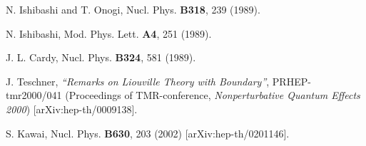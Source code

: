 \documentclass[a4paper,12pt]{article}
\begin{document}
\begin{thebibliography}{99}
  N. Ishibashi and T. Onogi,
Nucl. Phys. \textbf{B318}, 239 (1989).

  N. Ishibashi,
Mod. Phys. Lett. \textbf{A4}, 251 (1989).

  J. L. Cardy,
Nucl. Phys. \textbf{B324}, 581 (1989).

  J. Teschner, \textit{``Remarks on Liouville Theory
with Boundary''}, PRHEP-tmr2000/041 (Proceedings of TMR-conference, \textit{%
Nonperturbative Quantum Effects 2000}) [arXiv:hep-th/0009138].

  S. Kawai,
Nucl. Phys. \textbf{B630}, 203 (2002) [arXiv:hep-th/0201146].
\end{thebibliography}
\end{document}

